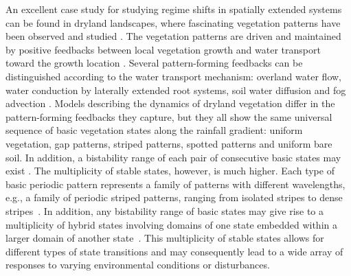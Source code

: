 \documentclass[aps,prl,preprint,superscriptaddress,floatfix]{revtex4-1}
\begin{document}
An excellent case study for studying regime shifts in spatially extended systems can be found in dryland landscapes, where fascinating vegetation patterns have been observed and studied 
\cite{Klausmeier1999science,vonhardenberg2001prl,Rietkerk2002an,sherratt-2005-analysis,Tlidi2008lnp,Rietkerk2004science,manor-2008-facilitation,Lejeune2002pre,Lejeune2004ijqc,HilleRisLambers2001ecology,Gilad2007jtb,Gilad2004prl,borgogno2009gr}. 
The vegetation patterns are driven and maintained by positive feedbacks between local vegetation growth and water transport toward the growth location \cite{Kinast2014prl,Meron2015book}. 
Several pattern-forming feedbacks can be distinguished according to the water transport mechanism: overland water flow, water conduction by laterally extended root systems, soil water diffusion and fog advection \cite{Meron2015book}.
Models describing the dynamics of dryland vegetation differ in the pattern-forming feedbacks they capture, but they all show the same universal sequence of basic vegetation states along the rainfall gradient: 
uniform vegetation, gap patterns, striped patterns, spotted patterns and uniform bare soil. 
In addition, a bistability range of each pair of consecutive basic states may exist \cite{meron2012ecomod,Gowda2014pre}.
The multiplicity of stable states, however, is much higher. 
Each type of basic periodic pattern represents a family of patterns with different wavelengths, e.g., a family of periodic striped patterns, ranging from isolated stripes to dense stripes~\cite{vanderStelt2013nonl_sci,zelnik2013regime}. 
In addition, any bistability range of basic states may give rise to a multiplicity of hybrid states involving domains of one state embedded within a larger domain of another state~\cite{Zelnik2015}.
This multiplicity of stable states allows for different types of state transitions and may consequently lead to a wide array of responses to varying environmental conditions or disturbances.
\end{document}
